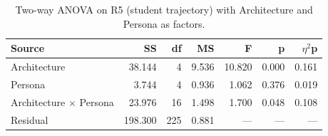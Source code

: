 \begin{table}[htbp]
\centering
\caption{Two-way ANOVA on R5 (student trajectory) with Architecture and Persona as factors.}
\label{tab:anova-R5}
\begin{tabular}{lrrrrrr}
\toprule
Source & SS & df & MS & F & p & $\eta$$^2$p \\
\midrule
Architecture & 38.144 & 4 & 9.536 & 10.820 & 0.000 & 0.161 \\
Persona & 3.744 & 4 & 0.936 & 1.062 & 0.376 & 0.019 \\
Architecture $\times$ Persona & 23.976 & 16 & 1.498 & 1.700 & 0.048 & 0.108 \\
Residual & 198.300 & 225 & 0.881 & --- & --- & --- \\
\bottomrule
\end{tabular}
\end{table}
